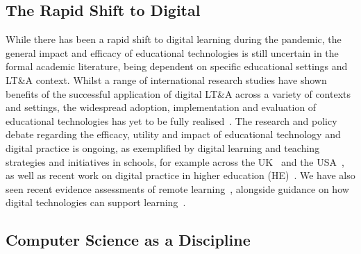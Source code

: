 \documentclass[sigconf]{acmart}
\begin{document}
\subsection{The Rapid Shift to Digital}

While there has been a rapid shift to digital learning during the
pandemic, the general impact and efficacy of educational technologies
is still uncertain in the formal academic literature, being dependent
on specific educational settings and LT\&A context. Whilst a range of
international research studies have shown benefits of the successful
application of digital LT\&A across a variety of contexts and
settings, the widespread adoption, implementation and evaluation of
educational technologies has yet to be fully
realised~\cite{decodinglearning:2012,means:2014,ecjrc:2017,mayer:2018}.
The research and policy debate regarding the efficacy, utility and
impact of educational technology and digital practice is ongoing, as
exemplified by digital learning and teaching strategies and
initiatives in schools, for example across the
UK~\cite{digscot:2016,dfe:2019} and the
USA~\cite{usdoe:2020}, as well as recent work on digital practice in
higher education (HE)~\cite{jisc:2020,wef:2020}. We have also seen
recent evidence assessments of remote learning~\cite{eefremote:2020},
alongside guidance on how digital technologies can support
learning~\cite{eefdigtech:2019}.


\subsection{Computer Science as a Discipline}

\end{document}
